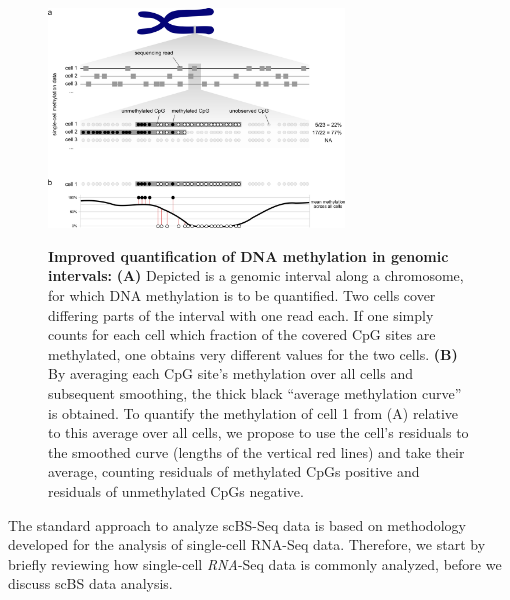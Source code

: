\documentclass[twocolumn,10pt]{article}
\begin{document}
\begin{figure}[t]
    \begin{center}
        \includegraphics[width=0.7\textwidth]{figures/Fig_residuals_AB.png}\\
    \end{center}
    \caption{\small \textbf{Improved quantification of DNA methylation in genomic intervals:}
    \textbf{(A)} Depicted is a genomic interval along a chromosome, for which DNA methylation is to be quantified.
Two cells cover differing parts of the interval with one read each.
If one simply counts for each cell which fraction of the covered CpG sites are methylated, one obtains very different values for the two cells.
    \textbf{(B)} By averaging each CpG site's methylation over all cells and subsequent smoothing, the thick black ``average methylation curve'' is obtained.
To quantify the methylation of cell 1 from (A) relative to this average over all cells, we propose to use the cell's residuals to the smoothed curve (lengths of the vertical red lines) and take their average, counting residuals of methylated CpGs positive and residuals of unmethylated CpGs negative.}
    \label{fig:smoothres}
\end{figure}


The standard approach to analyze scBS-Seq data is based on methodology developed for the analysis of single-cell RNA-Seq data.
Therefore, we start by briefly reviewing how single-cell \emph{RNA}-Seq data is commonly analyzed, before we discuss scBS data analysis.
\end{document}
